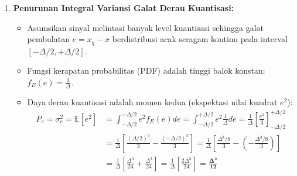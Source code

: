 \documentclass[11pt,a4paper]{article}
\begin{document}
\begin{penurunanbox}[Penurunan Eksak Daya Derau Kuantisasi $\sigma_e^2 = \Delta^2/12$ dan Formula SQNR]
\begin{enumerate}[leftmargin=*]
  \item \textbf{Penurunan Integral Variansi Galat Derau Kuantisasi:}
  \begin{itemize}
    \item Asumsikan sinyal melintasi banyak level kuantisasi sehingga galat pembulatan $e = x_q - x$ berdistribusi acak seragam kontinu pada interval $[-\Delta/2, +\Delta/2]$.
    \item Fungsi kerapatan probabilitas (PDF) adalah tinggi balok konstan: $f_E(e) = \frac{1}{\Delta}$.
    \item Daya derau kuantisasi adalah momen kedua (ekspektasi nilai kuadrat $e^2$):
    \begin{align}
    P_e = \sigma_e^2 = \mathbb{E}[e^2] &= \int_{-\Delta/2}^{+\Delta/2} e^2 f_E(e) de = \int_{-\Delta/2}^{+\Delta/2} e^2 \frac{1}{\Delta} de = \frac{1}{\Delta} \left[ \frac{e^3}{3} \right]_{-\Delta/2}^{+\Delta/2} \nonumber \\
    &= \frac{1}{\Delta} \left[ \frac{(\Delta/2)^3}{3} - \frac{(-\Delta/2)^3}{3} \right] = \frac{1}{\Delta} \left[ \frac{\Delta^3/8}{3} - \left(-\frac{\Delta^3/8}{3}\right) \right] \nonumber \\
    &= \frac{1}{\Delta} \left[ \frac{\Delta^3}{24} + \frac{\Delta^3}{24} \right] = \frac{1}{\Delta} \left[ \frac{2\Delta^3}{24} \right] = \mathbf{\frac{\Delta^2}{12}}
    \end{align}
  \end{itemize}


\end{enumerate}
\end{penurunanbox}
\end{document}
